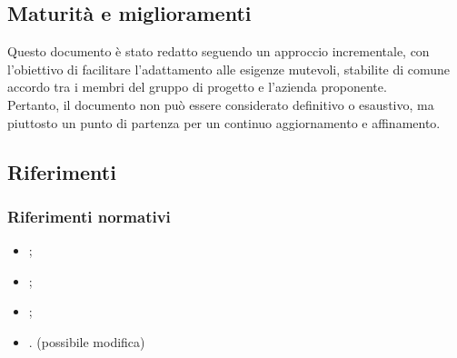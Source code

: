 \subsection{Maturità e miglioramenti}
Questo documento è stato redatto seguendo un approccio incrementale, 
con l'obiettivo di facilitare l'adattamento alle esigenze mutevoli, stabilite 
di comune accordo tra i membri del gruppo di progetto e l'azienda proponente.\\
Pertanto, il documento non può essere considerato definitivo o esaustivo, ma 
piuttosto un punto di partenza per un continuo aggiornamento e affinamento.

\subsection{Riferimenti}
\subsubsection{Riferimenti normativi}
\begin{itemize}
    \item {}; \\
    \item {}; \\
    \item {}; \\
    \item {}. (possibile modifica)
\end{itemize}

